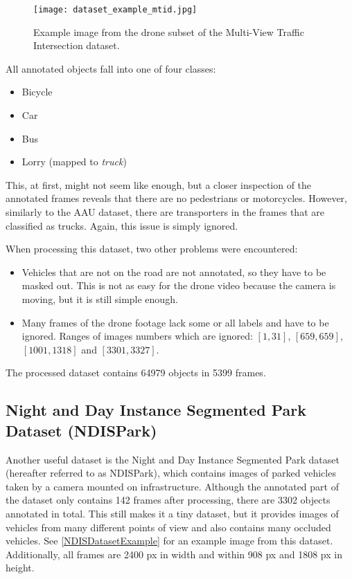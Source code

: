 \begin{figure}[t]
    \centering
    \texttt{[image: dataset\_example\_mtid.jpg]}
    \captionsetup{width=0.8\textwidth}
    \caption{Example image from the drone subset of the Multi-View Traffic Intersection dataset.}
    \label{MTIDDatasetExample}
\end{figure}

All annotated objects fall into one of four classes:
\begin{itemize}
    \item Bicycle
    \item Car
    \item Bus
    \item Lorry (mapped to \textit{truck})
\end{itemize}
This, at first, might not seem like enough, but a closer inspection of the
annotated frames reveals that there are no pedestrians or motorcycles. However,
similarly to the AAU dataset, there are transporters in the frames
that are classified as trucks. Again, this issue is simply ignored.

When processing this dataset, two other problems were encountered:
\begin{itemize}
    \item Vehicles that are not on the road are not annotated, so they have to
    be masked out. This is not as easy for the drone video because the camera is
    moving, but it is still simple enough.
    \item Many frames of the drone footage lack some or all labels and have to
    be ignored. Ranges of images numbers which are ignored: $[1,31]$,
    $[659,659]$, $[1001,1318]$ and $[3301,3327]$.
\end{itemize}
The processed dataset contains \num{64979} objects in \num{5399} frames.


\subsection{Night and Day Instance Segmented Park Dataset (NDISPark)}

Another useful dataset is the Night and Day Instance Segmented Park
dataset~\cite{Luca2022} (hereafter referred to as NDISPark), which contains
images of parked vehicles taken by a camera mounted on infrastructure. Although
the annotated part of the dataset only contains \num{142} frames after
processing, there are \num{3302} objects annotated in total. This still makes it
a tiny dataset, but it provides images of vehicles from many different points of
view and also contains many occluded vehicles. See \autoref{NDISDatasetExample}
for an example image from this dataset. Additionally, all frames are \num{2400}
px in width and within \num{908} px and \num{1808} px in height.

